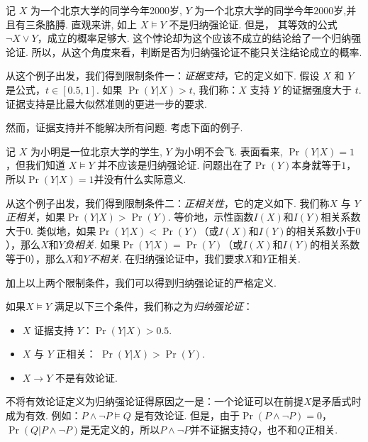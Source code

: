 \begin{example}[奇怪的例子一]
记 $X$ 为一个北京大学的同学今年2000岁, $Y$ 为一个北京大学的同学今年2000岁,并且有三条胳膊. 直观来讲, 如上 $X\models Y$ 不是归纳强论证. 但是， 其等效的公式$\neg X\vee Y$，成立的概率足够大. 这个悖论却为这个应该不成立的结论给了一个归纳强论证. 所以，从这个角度来看，判断是否为归纳强论证不能只关注结论成立的概率.
\end{example}

从这个例子出发，我们得到限制条件一：\emph{证据支持}，它的定义如下. 假设 $X$ 和 $Y$ 是公式，$t\in [0.5, 1]$. 如果 $\Pr(Y|X)>t$, 我们称：$X$ 支持 $Y$ 的证据强度大于 $t$. 证据支持是比最大似然准则的更进一步的要求.

然而，证据支持并不能解决所有问题. 考虑下面的例子.

\begin{example}[奇怪的例子二]
记 $X$ 为小明是一位北京大学的学生, $Y$ 为小明不会飞. 表面看来, $\Pr(Y|X)=1$，但我们知道 $X\models Y$ 并不应该是归纳强论证. 问题出在了$\Pr(Y)$本身就等于$1$，所以$\Pr(Y|X)=1$并没有什么实际意义.
\end{example}

从这个例子出发，我们得到限制条件二：\emph{正相关性}，它的定义如下. 我们称$X$ 与 $Y$ \emph{正相关}，如果$\Pr(Y|X) > \Pr(Y)$. 等价地，示性函数$I(X)$和$I(Y)$相关系数大于$0$. 类似地，如果$\Pr(Y|X) < \Pr(Y)$（或$I(X)$和$I(Y)$的相关系数小于$0$），那么$X$和$Y$\emph{负相关}. 如果$\Pr(Y|X) = \Pr(Y)$（或$I(X)$和$I(Y)$的相关系数等于$0$），那么$X$和$Y$\emph{不相关}. 在归纳强论证中，我们要求$X$和$Y$正相关.

加上以上两个限制条件，我们可以得到归纳强论证的严格定义.

\begin{definition}[归纳强论证]
    如果$X \models Y$ 满足以下三个条件，我们称之为\emph{归纳强论证}：
	\begin{itemize}
	\item $X$ 证据支持 $Y$：$\Pr(Y|X)>0.5$.
	\item $X$ 与 $Y$ 正相关： $\Pr(Y|X) > \Pr(Y)$. 
	\item $X\rightarrow Y$ 不是有效论证.
	\end{itemize}
\end{definition}

不将有效论证定义为归纳强论证得原因之一是：一个论证可以在前提$X$是矛盾式时成为有效. 例如：$P \wedge \neg P \models Q$ 是有效论证. 但是，由于$\Pr(P \wedge \neg P) = 0$，$\Pr(Q | P \wedge \neg P)$是无定义的，所以$P \wedge \neg P$并不证据支持$Q$，也不和$Q$正相关.

